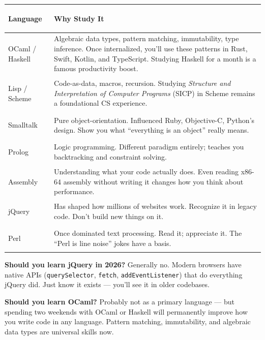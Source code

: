 \documentclass[11pt, letterpaper]{article}
\begin{document}
\noindent
{\renewcommand{\arraystretch}{1.5}
\begin{tabularx}{\textwidth}{>{\bfseries\raggedright\arraybackslash}p{2.5cm}
                              >{\raggedright\arraybackslash}X}
\toprule
\rowcolor{tableheader}
\textbf{Language} & \textbf{Why Study It} \\
\midrule
\rowcolor{rowB} OCaml / Haskell    & Algebraic data types, pattern matching, immutability, type inference. Once internalized, you'll use these patterns in Rust, Swift, Kotlin, and TypeScript. Studying Haskell for a month is a famous productivity boost. \\
\rowcolor{rowA} Lisp / Scheme       & Code-as-data, macros, recursion. Studying \emph{Structure and Interpretation of Computer Programs} (SICP) in Scheme remains a foundational CS experience. \\
\rowcolor{rowB} Smalltalk           & Pure object-orientation. Influenced Ruby, Objective-C, Python's design. Show you what ``everything is an object'' really means. \\
\rowcolor{rowA} Prolog              & Logic programming. Different paradigm entirely; teaches you backtracking and constraint solving. \\
\rowcolor{rowB} Assembly            & Understanding what your code actually does. Even reading x86-64 assembly without writing it changes how you think about performance. \\
\rowcolor{rowA} jQuery              & Has shaped how millions of websites work. Recognize it in legacy code. Don't build new things on it. \\
\rowcolor{rowB} Perl                & Once dominated text processing. Read it; appreciate it. The ``Perl is line noise'' jokes have a basis. \\
\bottomrule
\end{tabularx}}

\textbf{Should you learn jQuery in 2026?} Generally no. Modern browsers have native APIs (\texttt{querySelector}, \texttt{fetch}, \texttt{addEventListener}) that do everything jQuery did. Just know it exists --- you'll see it in older codebases.

\textbf{Should you learn OCaml?} Probably not as a primary language --- but spending two weekends with OCaml or Haskell will permanently improve how you write code in any language. Pattern matching, immutability, and algebraic data types are universal skills now.

\newpage
\end{document}
